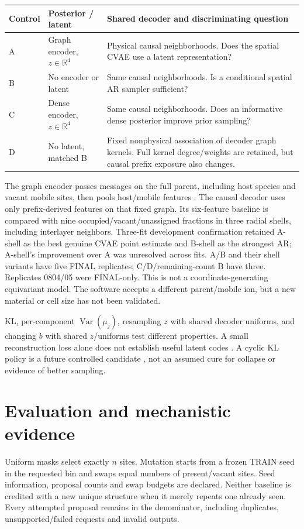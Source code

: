 \documentclass[10pt]{article}
\begin{document}
\begin{center}\small
\begin{tabular}{p{.07\linewidth}p{.23\linewidth}p{.57\linewidth}}
\toprule Control & Posterior / latent & Shared decoder and discriminating question\\\midrule
A & Graph encoder, $z\in\mathbb R^4$ & Physical causal neighborhoods. Does the spatial CVAE use a latent representation?\\
B & No encoder or latent & Same causal neighborhoods. Is a conditional spatial AR sampler sufficient?\\
C & Dense encoder, $z\in\mathbb R^4$ & Same causal neighborhoods. Does an informative dense posterior improve prior sampling?\\
D & No latent, matched B & Fixed nonphysical association of decoder graph kernels. Full kernel degree/weights are retained, but causal prefix exposure also changes.\\\bottomrule
\end{tabular}
\end{center}
The graph encoder passes messages on the full parent, including host species
and vacant mobile sites, then pools host/mobile features \cite{gilmer2017}.
The causal decoder uses only prefix-derived features on that fixed graph.
Its six-feature baseline is compared with nine occupied/vacant/unassigned
fractions in three radial shells, including interlayer neighbors. Three-fit
development confirmation retained A-shell as the best genuine CVAE point
estimate and B-shell as the strongest AR; A-shell's improvement over A was
unresolved across fits. A/B and their shell variants have five FINAL replicates;
C/D/remaining-count B have three. Replicates 0804/05 were FINAL-only.
This is not a coordinate-generating equivariant model. The software accepts a
different parent/mobile ion, but a new material or cell size has not been validated.

KL, per-component $\operatorname{Var}(\mu_j)$, resampling $z$ with shared decoder
uniforms, and changing $b$ with shared $z$/uniforms test different properties.
A small reconstruction loss alone does not establish useful latent codes
\cite{alemi2018}. A cyclic KL policy is a future controlled candidate
\cite{fu2019}, not an assumed cure for collapse or evidence of better sampling.
\newpage

\section{Evaluation and mechanistic evidence}
Uniform masks select exactly $n$ sites. Mutation starts from a frozen TRAIN seed
in the requested bin and swaps equal numbers of present/vacant sites. Seed
information, proposal counts and swap budgets are declared. Neither baseline
is credited with a new unique structure when it merely repeats one already
seen. Every attempted proposal remains in the denominator, including duplicates,
unsupported/failed requests and invalid outputs.
\end{document}
